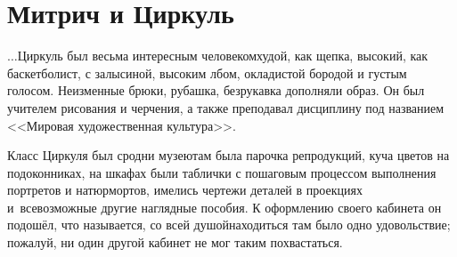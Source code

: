 \newpage
\section*{Митрич и Циркуль}

$\ldots$Циркуль был весьма интересным человеком\mdash худой, как щепка, высокий, как баскетболист, с залысиной, высоким лбом, окладистой бородой и густым голосом. Неизменные брюки, рубашка, безрукавка дополняли образ. Он был учителем рисования и черчения, а также преподавал дисциплину под названием <<Мировая художественная культура>>. 

Класс Циркуля был сродни музею\mdash там была парочка репродукций, куча цветов на подоконниках, на шкафах были таблички с пошаговым процессом выполнения портретов и натюрмортов, имелись чертежи деталей в проекциях и~всевозможные другие наглядные пособия. К оформлению своего кабинета он подошёл, что называется, со всей душой\mdash находиться там было одно удовольствие; пожалуй, ни один другой кабинет не мог таким похвастаться.



\begin{center}
\end{center}